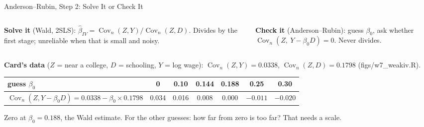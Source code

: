 \documentclass[aspectratio=169,11pt,xcolor=dvipsnames]{beamer}
\newcommand{\srcp}[1]{{\scriptsize\color{gray}(#1)}}
\DeclareMathOperator{\Cov}{Cov}
\begin{document}
\begin{frame}{Anderson--Rubin, Step 2: Solve It or Check It}
\begin{columns}[T]
\begin{column}{0.48\textwidth}
\textbf{Solve it} (Wald, 2SLS): $\hat\beta_{IV} = \Cov_n(Z,Y)/\Cov_n(Z,D)$.
Divides by the first stage; unreliable when that is small and noisy.
\end{column}
\begin{column}{0.48\textwidth}
\textbf{Check it} (Anderson--Rubin): guess $\beta_0$, ask whether
$\Cov_n(Z,\ Y - \beta_0 D) = 0$. Never divides.
\end{column}
\end{columns}
\vskip6pt
\textbf{Card's data} ($Z$ = near a college, $D$ = schooling, $Y$ = log wage):
$\Cov_n(Z,Y) = 0.0338$, $\Cov_n(Z,D) = 0.1798$ \srcp{figs/w7\_weakiv.R}.
\begin{center}\small
\renewcommand{\arraystretch}{1.1}
\begin{tabular}{@{}lcccccc@{}}
\toprule
guess $\beta_0$ & 0 & 0.10 & 0.144 & 0.188 & 0.25 & 0.30 \\
\midrule
$\Cov_n(Z, Y - \beta_0 D) = 0.0338 - \beta_0 \times 0.1798$ & 0.034 & 0.016 & 0.008 & 0.000 & $-0.011$ & $-0.020$ \\
\bottomrule
\end{tabular}
\end{center}
\vskip4pt
Zero at $\beta_0 = 0.188$, the Wald estimate. For the other guesses: how far from
zero is too far? That needs a scale.
\end{frame}
\end{document}
